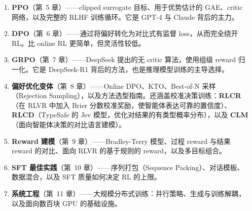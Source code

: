 \begin{enumerate}
  \item \textbf{PPO}（第~5 章）——clipped surrogate 目标、用于优势估计的 GAE、critic 网络，以及完整的 RLHF 训练循环。它是 GPT-4 与 Claude 背后的主力。
  \item \textbf{DPO}（第~6 章）——通过将偏好转化为对比式有监督 loss，从而完全绕开 RL。比 online RL 更简单，但灵活性较低。
  \item \textbf{GRPO}（第~7 章）——DeepSeek 提出的无 critic 算法，使用组级 reward 归一化。它是 DeepSeek-R1 背后的方法，也是推理模型训练的主导选择。
\item \textbf{偏好优化变体}（第~8 章）——Online DPO、KTO、Best-of-N 采样（Rejection Sampling），以及方法选型指南。还涵盖校准决策训练：\textbf{RLCR}（在 RLVR 中加入 Brier 分数校准奖励，使智能体表达可靠的置信度）、\textbf{RLCD}（TypeSafe 的 Jev 模型，优化对结果的有类型概率分布），以及 \textbf{CLM}（面向智能体决策的对比语言建模）。
  \item \textbf{Reward 建模}（第~9 章）——Bradley-Terry 模型、过程 reward 与结果 reward 的对比、面向 RLVR 的基于规则的 reward，以及多目标组合。
  \item \textbf{SFT 最佳实践}（第~10 章）——序列打包（Sequence Packing）、对话模板、数据混合，以及 SFT 质量如何决定 RL 的上限。
  \item \textbf{系统工程}（第~11 章）——大规模分布式训练：并行策略、生成与训练解耦，以及面向数百块 GPU 的基础设施。
\end{enumerate}

